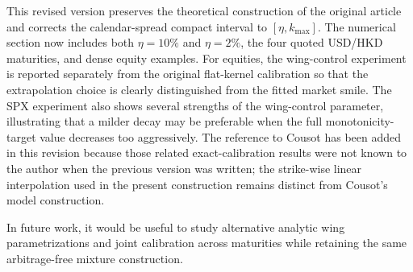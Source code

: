 \documentclass[11pt]{article}
\begin{document}
This revised version preserves the theoretical construction of the original article \cite{elalaoui2023} and corrects the calendar-spread compact interval to $[\eta,k_{\max}]$. The numerical section now includes both $\eta=10\%$ and $\eta=2\%$, the four quoted USD/HKD maturities, and dense equity examples. For equities, the wing-control experiment is reported separately from the original flat-kernel calibration so that the extrapolation choice is clearly distinguished from the fitted market smile. The SPX experiment also shows several strengths of the wing-control parameter, illustrating that a milder decay may be preferable when the full monotonicity-target value decreases too aggressively. The reference to Cousot \cite{cousot2007} has been added in this revision because those related exact-calibration results were not known to the author when the previous version was written; the strike-wise linear interpolation used in the present construction remains distinct from Cousot's model construction.

In future work, it would be useful to study alternative analytic wing parametrizations and joint calibration across maturities while retaining the same arbitrage-free mixture construction.
\end{document}
